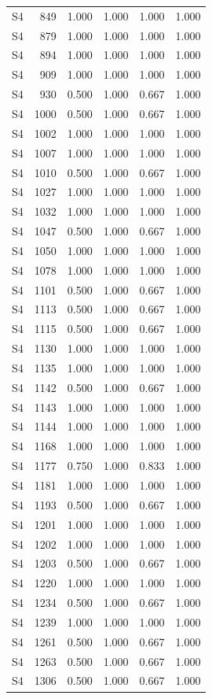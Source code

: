 \begin{tabular}{lrrrrr}
S4 & 849 & 1.000 & 1.000 & 1.000 & 1.000 \\
S4 & 879 & 1.000 & 1.000 & 1.000 & 1.000 \\
S4 & 894 & 1.000 & 1.000 & 1.000 & 1.000 \\
S4 & 909 & 1.000 & 1.000 & 1.000 & 1.000 \\
S4 & 930 & 0.500 & 1.000 & 0.667 & 1.000 \\
S4 & 1000 & 0.500 & 1.000 & 0.667 & 1.000 \\
S4 & 1002 & 1.000 & 1.000 & 1.000 & 1.000 \\
S4 & 1007 & 1.000 & 1.000 & 1.000 & 1.000 \\
S4 & 1010 & 0.500 & 1.000 & 0.667 & 1.000 \\
S4 & 1027 & 1.000 & 1.000 & 1.000 & 1.000 \\
S4 & 1032 & 1.000 & 1.000 & 1.000 & 1.000 \\
S4 & 1047 & 0.500 & 1.000 & 0.667 & 1.000 \\
S4 & 1050 & 1.000 & 1.000 & 1.000 & 1.000 \\
S4 & 1078 & 1.000 & 1.000 & 1.000 & 1.000 \\
S4 & 1101 & 0.500 & 1.000 & 0.667 & 1.000 \\
S4 & 1113 & 0.500 & 1.000 & 0.667 & 1.000 \\
S4 & 1115 & 0.500 & 1.000 & 0.667 & 1.000 \\
S4 & 1130 & 1.000 & 1.000 & 1.000 & 1.000 \\
S4 & 1135 & 1.000 & 1.000 & 1.000 & 1.000 \\
S4 & 1142 & 0.500 & 1.000 & 0.667 & 1.000 \\
S4 & 1143 & 1.000 & 1.000 & 1.000 & 1.000 \\
S4 & 1144 & 1.000 & 1.000 & 1.000 & 1.000 \\
S4 & 1168 & 1.000 & 1.000 & 1.000 & 1.000 \\
S4 & 1177 & 0.750 & 1.000 & 0.833 & 1.000 \\
S4 & 1181 & 1.000 & 1.000 & 1.000 & 1.000 \\
S4 & 1193 & 0.500 & 1.000 & 0.667 & 1.000 \\
S4 & 1201 & 1.000 & 1.000 & 1.000 & 1.000 \\
S4 & 1202 & 1.000 & 1.000 & 1.000 & 1.000 \\
S4 & 1203 & 0.500 & 1.000 & 0.667 & 1.000 \\
S4 & 1220 & 1.000 & 1.000 & 1.000 & 1.000 \\
S4 & 1234 & 0.500 & 1.000 & 0.667 & 1.000 \\
S4 & 1239 & 1.000 & 1.000 & 1.000 & 1.000 \\
S4 & 1261 & 0.500 & 1.000 & 0.667 & 1.000 \\
S4 & 1263 & 0.500 & 1.000 & 0.667 & 1.000 \\
S4 & 1306 & 0.500 & 1.000 & 0.667 & 1.000 \\
\bottomrule
\end{tabular}
